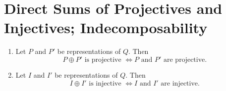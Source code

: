 \documentclass[11pt, a4paper]{report}
\begin{document}
\section{Direct Sums of Projectives and Injectives; Indecomposability}

\begin{proposition}\label{prop:7.2.1}\leavevmode
    \begin{enumerate}
        \item[(1)] Let $P$ and $P'$ be representations of $Q$. Then
        \[
            P \oplus P' \text{ is projective }
            \Longleftrightarrow
            P \text{ and } P' \text{ are projective.}
        \]

        \item[(2)] Let $I$ and $I'$ be representations of $Q$. Then
        \[
            I \oplus I' \text{ is injective }
            \Longleftrightarrow
            I \text{ and } I' \text{ are injective.}
        \]
    \end{enumerate}
\end{proposition}
\end{document}
